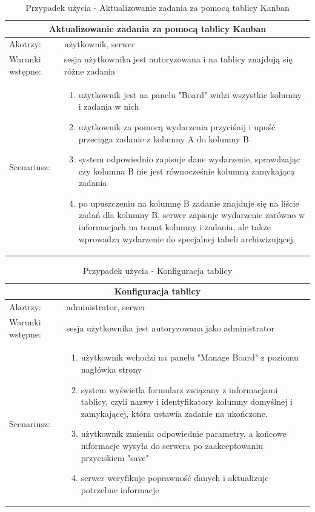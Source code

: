 \begin{table}[h!]
	\begin{tabular}{|p{2cm}||p{13cm}|  }
		
		
		
		\hline
		\multicolumn{2}{|c|}{Aktualizowanie zadania za pomocą tablicy Kanban} \\
		\hline
		Akotrzy: & użytkownik, serwer \\
		\hline
		Warunki wstępne: & sesja użytkownika jest autoryzowana i na tablicy znajdują się różne zadania \\
		\hline
		Scenariusz: &
		\begin{enumerate}
			\item użytkownik jest na panelu "Board" widzi wszystkie kolumny i zadania w nich
			\item użytkownik za pomocą wydarzenia przyciśnij i upuść przeciąga zadanie z kolumny A do kolumny B
			\item system odpowiednio zapisuje dane wydarzenie, sprawdzając czy kolumna B nie jest równocześnie kolumną zamykającą zadania
			\item po upuszczeniu na kolumnę B zadanie znajduje się na liście zadań dla kolumny B, serwer zapisuje wydarzenie zarówno w informacjach na temat kolumny i zadania, ale także wprowadza wydarzenie do specjalnej tabeli archiwizującej.
		\end{enumerate}\\
		\hline
	\end{tabular}
	\caption{Przypadek użycia - Aktualizowanie zadania za pomocą tablicy Kanban}
\end{table}


\begin{table}[h!]
	\begin{tabular}{|p{2cm}||p{13cm}|  }
		
		
		
		\hline
		\multicolumn{2}{|c|}{Konfiguracja tablicy} \\
		\hline
		Akotrzy: & administrator, serwer \\
		\hline
		Warunki wstępne: & sesja użytkownika jest autoryzowana jako administrator  \\
		\hline
		Scenariusz: &
		\begin{enumerate}
			\item użytkownik wchodzi na panelu "Manage Board" z poziomu nagłówka strony 
			\item system wyświetla formularz związany z informacjami tablicy, czyli nazwy i identyfikatory kolumny domyślnej i zamykającej, która ustawia zadanie na ukończone.
			\item użytkownik zmienia odpowiednie parametry, a końcowe informacje wysyła do serwera po zaakceptowaniu przyciskiem "save"
			\item serwer weryfikuje poprawność danych i aktualizuje potrzebne informacje
		\end{enumerate}\\
		\hline
	\end{tabular}
	\caption{Przypadek użycia - Konfiguracja tablicy}
\end{table}


